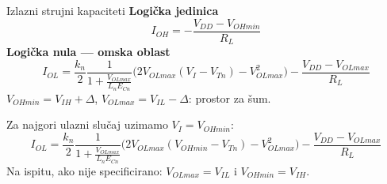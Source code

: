 \begin{frame}[label=09_1-s027]{Izlazni strujni kapaciteti}\setlength{\parskip}{2pt}\setlength{\abovedisplayskip}{4pt}\setlength{\belowdisplayskip}{4pt}\setlength{\abovedisplayshortskip}{3pt}\setlength{\belowdisplayshortskip}{3pt}
\textbf{Logička jedinica}\[I_{OH}=-\frac{V_{DD}-V_{OHmin}}{R_L}\]
\textbf{Logička nula — omska oblast}\[I_{OL}=\frac{k_n}{2}\frac1{1+\frac{V_{OLmax}}{L_nE_{Cn}}}\bigl(2V_{OLmax}(V_I-V_{Tn})-V_{OLmax}^2\bigr)-\frac{V_{DD}-V_{OLmax}}{R_L}\]
$V_{OHmin}=V_{IH}+\Delta$, $V_{OLmax}=V_{IL}-\Delta$: prostor za šum.\par Za najgori ulazni slučaj uzimamo $V_I=V_{OHmin}$:\[I_{OL}=\frac{k_n}{2}\frac1{1+\frac{V_{OLmax}}{L_nE_{Cn}}}\bigl(2V_{OLmax}(V_{OHmin}-V_{Tn})-V_{OLmax}^2\bigr)-\frac{V_{DD}-V_{OLmax}}{R_L}\]
\medskip\alert{Na ispitu, ako nije specificirano: $V_{OLmax}=V_{IL}$ i $V_{OHmin}=V_{IH}$.}
\end{frame}
